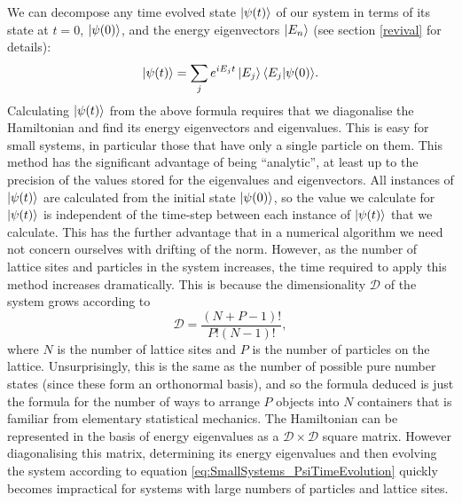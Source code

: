 \documentclass[a4paper, 10pt]{article}
\theoremstyle{plain}
\begin{document}
We can decompose any time evolved state $\ket{\psi(t)}$ of our system in terms
of its state at $t=0$, $\ket{\psi(0)}$, and the energy eigenvectors $\ket{E_n}$
(see section \ref{revival} for details):
\begin{equation}
    \label{eq:SmallSystems_PsiTimeEvolution}
    \ket{\psi(t)} = \sum_{j}{e^{i E_{j}t} \ket{E_{j}} \braket{E_{j}|\psi(0)}}.
\end{equation}
Calculating $\ket{\psi(t)}$ from the above formula requires that we diagonalise
the Hamiltonian and find its energy eigenvectors and eigenvalues. This is easy
for small systems, in particular those that have only a single particle on them.
This method has the significant advantage of being ``analytic'', at least up to
the precision of the values stored for the eigenvalues and eigenvectors. All
instances of $\ket{\psi(t)}$ are calculated from the initial state
$\ket{\psi(0)}$, so the value we calculate for $\ket{\psi(t)}$ is independent of
the time-step between each instance of $\ket{\psi(t)}$ that we calculate. This
has the further advantage that in a numerical algorithm we need not concern
ourselves with drifting of the norm. However, as the number of lattice sites and
particles in the system increases, the time required to apply this method
increases dramatically. This is because the dimensionality $\mathcal{D}$ of the
system grows according to
\begin{equation}
    \label{dimensionality_exact}
    \mathcal{D} = \frac{(N + P - 1)!}{P! (N-1)!},
\end{equation}
where $N$ is the number of lattice sites and $P$ is the number of particles on
the lattice. Unsurprisingly, this is the same as the number of possible pure
number states (since these form an orthonormal basis), and so the formula
deduced is just the formula for the number of ways to arrange $P$ objects into
$N$ containers that is familiar from elementary statistical mechanics.
The Hamiltonian can be represented in the basis of energy eigenvalues as a
$\mathcal{D} \times \mathcal{D}$ square matrix. However diagonalising this
matrix, determining its energy eigenvalues and then evolving the system
according to equation \eqref{eq:SmallSystems_PsiTimeEvolution} quickly becomes
impractical for systems with large numbers of particles and lattice sites. 
\end{document}
